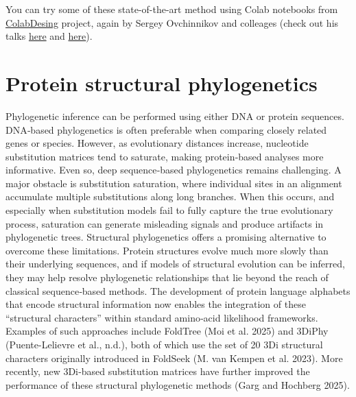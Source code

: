 \documentclass[
]{scrbook}
\begin{document}
You can try some of these state-of-the-art method using Colab notebooks
from \href{https://github.com/sokrypton/ColabDesign}{ColabDesing}
project, again by Sergey Ovchinnikov and colleages (check out his talks
\href{https://www.youtube.com/watch?v=2HmXwlKWMVs}{here} and
\href{https://www.youtube.com/watch?v=smjYJSudwr0}{here}).

\begin{centering}\begin{tcolorbox}[hbox,
colframe=lightgray,
colback=white]

\textcolor{ProcessBlue}{{\Large {\faTwitterSquare}}} %

\href{https://twitter.com/sokrypton/status/1514227001183416320}{}

\end{tcolorbox}\end{centering}
\vspace{1em}

\chapter{Protein structural
phylogenetics}\label{protein-structural-phylogenetics}

Phylogenetic inference can be performed using either DNA or protein
sequences. DNA‑based phylogenetics is often preferable when comparing
closely related genes or species. However, as evolutionary distances
increase, nucleotide substitution matrices tend to saturate, making
protein‑based analyses more informative. Even so, deep sequence‑based
phylogenetics remains challenging. A major obstacle is substitution
saturation, where individual sites in an alignment accumulate multiple
substitutions along long branches. When this occurs, and especially when
substitution models fail to fully capture the true evolutionary process,
saturation can generate misleading signals and produce artifacts in
phylogenetic trees. Structural phylogenetics offers a promising
alternative to overcome these limitations. Protein structures evolve
much more slowly than their underlying sequences, and if models of
structural evolution can be inferred, they may help resolve phylogenetic
relationships that lie beyond the reach of classical sequence‑based
methods. The development of protein language alphabets that encode
structural information now enables the integration of these ``structural
characters'' within standard amino‑acid likelihood frameworks. Examples
of such approaches include FoldTree (Moi et al. 2025) and 3DiPhy
(Puente-Lelievre et al., n.d.), both of which use the set of 20 3Di
structural characters originally introduced in FoldSeek (M. van Kempen
et al. 2023). More recently, new 3Di‑based substitution matrices have
further improved the performance of these structural phylogenetic
methods (Garg and Hochberg 2025).
\end{document}
